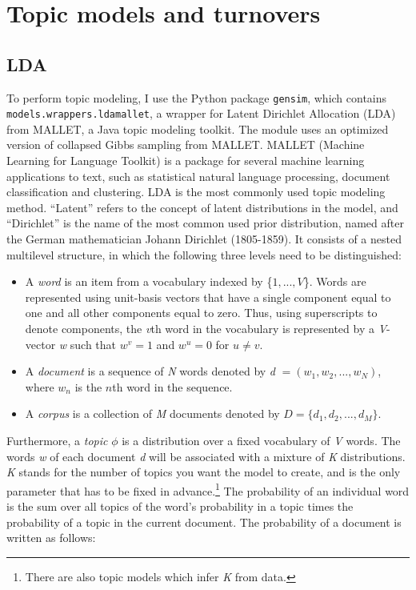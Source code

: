 \chapter{Topic models and turnovers}

\section{LDA}
To perform topic modeling, I use the Python package \texttt{gensim}, which contains \texttt{models.wrappers.ldamallet}, a wrapper for Latent Dirichlet Allocation (LDA) from MALLET, a Java topic modeling toolkit. The module uses an optimized version of collapsed Gibbs sampling from MALLET. MALLET (Machine Learning for Language Toolkit) is a package for several machine learning applications to text, such as statistical natural language processing, document classification and clustering. LDA is the most commonly used topic modeling method. \enquote{Latent} refers to the concept of latent distributions in the model, and \enquote{Dirichlet} is the name of the most common used prior distribution, named after the German mathematician Johann Dirichlet (1805-1859). It consists of a nested multilevel structure, in which the following three levels need to be distinguished:\autocites[995]{blei_latent_nodate}{blei_probabilistic_2010}
\begin{itemize}
	\item A \textit{word} is an item from a vocabulary indexed by \{$1,...,V$\}. Words are represented using unit-basis vectors that have a single component equal to one and all other components equal to zero. Thus, using superscripts to denote components, the \textit{v}th word in the vocabulary is represented by a \textit{V}-vector \textit{w} such that $w^{v} = 1$ and $w^{u} = 0$ for $u \neq v$.
	\item A \textit{document} is a sequence of \textit{N} words denoted by \textit{d} $= (w_{1},w_{2},...,w_{N})$, where $w_{n}$ is the $n$th word in the sequence.
	\item A \textit{corpus} is a collection of \textit{M} documents denoted by $D = \{\textit{d}_{1},\textit{d}_{2},...,\textit{d}_{M}\}$.
\end{itemize}
Furthermore, a \textit{topic} $\phi$ is a distribution over a fixed vocabulary of \textit{V} words. The words \textit{w} of each document \textit{d} will be associated with a mixture of \textit{K} distributions. \textit{K} stands for the number of topics you want the model to create, and is the only parameter that has to be fixed in advance.\footnote{There are also topic models which infer \textit{K} from data.} The probability of an individual word is the sum over all topics of the word's probability in a topic times the probability of a topic in the current document. The probability of a document is written as follows: \autocite[277]{karsdorp_humanities_2019}

